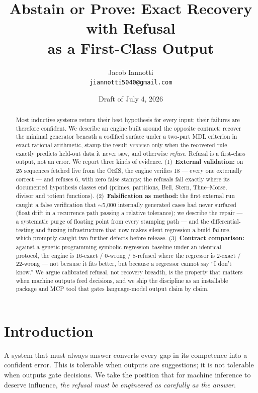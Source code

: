 \documentclass[11pt]{article}
\title{Abstain or Prove: Exact Recovery with Refusal\\ as a First-Class Output}
\author{Jacob Iannotti\\ \small\texttt{jiannotti5040@gmail.com}}
\date{Draft of July 4, 2026}
\newcommand{\Verified}{\textsc{verified}}
\begin{document}
\maketitle

\begin{abstract}
Most inductive systems return their best hypothesis for every input; their
failures are therefore confident. We describe an engine built around the
opposite contract: recover the minimal generator beneath a codified surface
under a two-part MDL criterion in exact rational arithmetic, stamp the result
\Verified{} only when the recovered rule exactly predicts held-out data it
never saw, and otherwise \emph{refuse}. Refusal is a first-class output, not
an error. We report three kinds of evidence. (1)~\textbf{External validation:}
on 25 sequences fetched live from the OEIS, the engine verifies 18 --- every
one externally correct --- and refuses 6, with zero false stamps; the refusals
fall exactly where its documented hypothesis classes end (primes, partitions,
Bell, Stern, Thue--Morse, divisor and totient functions). (2)~\textbf{Falsification
as method:} the first external run caught a false verification that
$\sim$5{,}000 internally generated cases had never surfaced (float drift in a
recurrence path passing a relative tolerance); we describe the repair --- a
systematic purge of floating point from every stamping path --- and the
differential-testing and fuzzing infrastructure that now makes silent
regression a build failure, which promptly caught two further defects before
release. (3)~\textbf{Contract comparison:} against a genetic-programming
symbolic-regression baseline under an identical protocol, the engine is
16-exact / 0-wrong / 8-refused where the regressor is 2-exact / 22-wrong ---
not because it fits better, but because a regressor cannot say ``I don't
know.'' We argue calibrated refusal, not recovery breadth, is the property
that matters when machine outputs feed decisions, and we ship the discipline
as an installable package and MCP tool that gates language-model output claim
by claim.
\end{abstract}

\section{Introduction}
A system that must always answer converts every gap in its competence into a
confident error. This is tolerable when outputs are suggestions; it is not
tolerable when outputs gate decisions. We take the position that for machine
inference to deserve influence, \emph{the refusal must be engineered as
carefully as the answer}.
\end{document}
